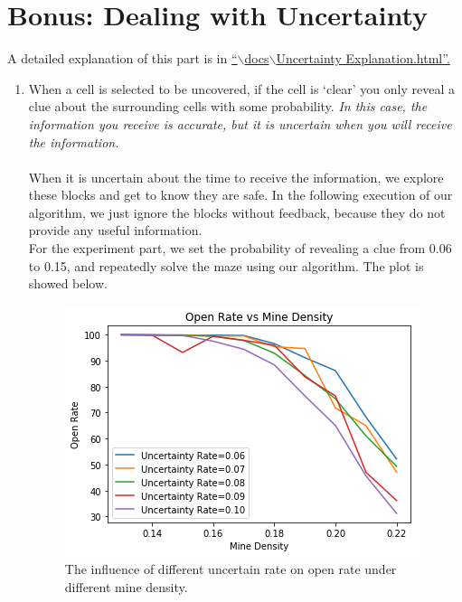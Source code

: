 \documentclass[letter]{article}
\begin{document}
\section{Bonus: Dealing with Uncertainty}
A detailed explanation of this part is in \href{run:Uncertainty Explanation.html}{``$ \backslash $docs$ \backslash $Uncertainty Explanation.html''.}
\begin{enumerate}
	\label{zhichao2}
	\item {When a cell is selected to be uncovered, if the cell is ‘clear’ you only reveal a clue about the surrounding cells with some probability. \textit{In this case, the information you receive is accurate, but it is uncertain when you will receive the information.}} \\
	\\
	When it is uncertain about the time to receive the information, we explore these blocks and get to know they are safe. In the following execution of our algorithm, we just ignore the blocks without feedback, because they do not provide any useful information. \\
	For the experiment part, we set the probability of revealing a clue from 0.06 to 0.15, and repeatedly solve the maze using our algorithm. The plot is showed below.
	\begin{figure}[H]
		\includegraphics[width=\textwidth]{../pics/plt1.png}
		\caption{\label{fig:plt1} The influence of different uncertain rate on open rate under different mine density.}
		\endminipage\hfill

\end{figure}
\end{enumerate}
\end{document}
